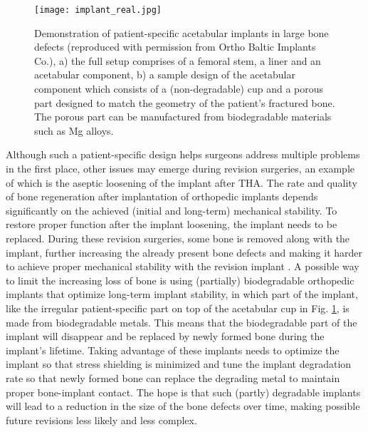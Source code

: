 \begin{figure}[htpb]
\centering
\medskip
\texttt{[image: implant\_real.jpg]}
\caption[Full setup of patient-specific acetabular implants]{Demonstration of patient-specific acetabular implants in large bone defects (reproduced with permission from Ortho Baltic Implants Co.\protect\footnotemark), a) the full setup comprises of a femoral stem, a liner and an acetabular component, b) a sample design of the acetabular component which consists of a (non-degradable) cup and a porous part designed to match the geometry of the patient's fractured bone. The porous part can be manufactured from biodegradable materials such as Mg alloys.} \label{fig:cup_implant_real}
\end{figure}

Although such a patient-specific design helps surgeons address multiple problems in the first place, other issues may emerge during revision surgeries, an example of which is the aseptic loosening of the implant after \gls{THA}. The rate and quality of bone regeneration after implantation of orthopedic implants depends significantly on the achieved (initial and long-term) mechanical stability. To restore proper function after the implant loosening, the implant needs to be replaced. During these revision surgeries, some bone is removed along with the implant, further increasing the already present bone defects and making it harder to achieve proper mechanical stability with the revision implant \cite{Luthringer2014}. A possible way to limit the increasing loss of bone is using (partially) biodegradable orthopedic implants that optimize long-term implant stability, in which part of the implant, like the irregular patient-specific part on top of the acetabular cup in Fig. \ref{fig:cup_implant_real}, is made from biodegradable metals. This means that the biodegradable part of the implant will disappear and be replaced by newly formed bone during the implant's lifetime. Taking advantage of these implants needs to optimize the implant so that stress shielding is minimized and tune the implant degradation rate so that newly formed bone can replace the degrading metal to maintain proper bone-implant contact. The hope is that such (partly) degradable implants will lead to a reduction in the size of the bone defects over time, making possible future revisions less likely and less complex.


